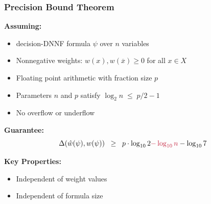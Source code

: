 \documentclass[t,pdf]{beamer}
\newcommand{\obar}[1]{\overline{#1}}
\newcommand{\approximate}[1]{\hat{#1}}
\newcommand{\approxw}{\approximate{w}}
\newcommand{\decimalprecision}{\Delta}
\newcommand{\rtext}[1]{\textcolor{xred}{#1}}
\begin{document}
\begin{frame}
  \frametitle{Precision Bound Theorem}

\bigskip

  \textbf{Assuming:}
  \begin{itemize}
  \item decision-DNNF formula $\psi$ over $n$ variables
  \item Nonnegative weights: $w(x), w(\obar{x}) \geq 0$ for all $x \in X$
  \item Floating point arithmetic with fraction size $p$
  \item Parameters $n$ and $p$ satisfy $\log_2 n \;\leq\; p/2-1$
  \item No overflow or underflow
  \end{itemize}

\medskip

\textbf{Guarantee:}
\begin{displaymath}
\decimalprecision(\approxw(\psi), w(\psi)) \;\; \geq \;\; p \cdot \log_{10}2 \rtext{- \log_{10}n} - \log_{10} 7
\end{displaymath}

\textbf{Key Properties:}
\begin{itemize}
\item Independent of weight values
\item Independent of formula size
\end{itemize}
\end{frame}
\end{document}
